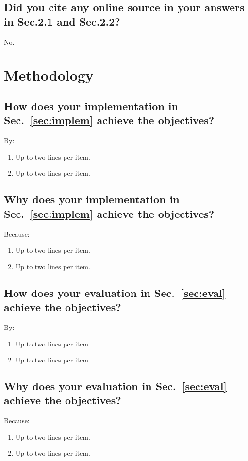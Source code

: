 \subsection{Did you cite any online source in your answers in Sec.2.1 and Sec.2.2?}
No.


\section{Methodology}

\subsection{How does your implementation in Sec.~\ref{sec:implem} achieve the objectives?}
By:
\begin{enumerate}
	\item Up to two lines per item.
	\item Up to two lines per item.
\end{enumerate}

\subsection{Why does your implementation in Sec.~\ref{sec:implem} achieve the objectives?}
Because:
\begin{enumerate}
	\item Up to two lines per item.
	\item Up to two lines per item.
\end{enumerate}

\subsection{How does your evaluation in Sec.~\ref{sec:eval} achieve the objectives?}
By:
\begin{enumerate}
	\item Up to two lines per item.
	\item Up to two lines per item.
\end{enumerate}

\subsection{Why does your evaluation in Sec.~\ref{sec:eval}  achieve the objectives?}
Because:
\begin{enumerate}
	\item Up to two lines per item.
	\item Up to two lines per item.
\end{enumerate}



